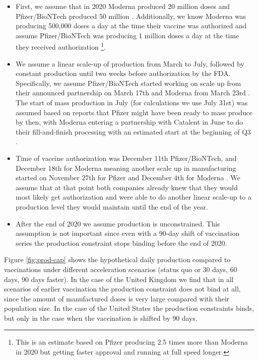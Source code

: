 \documentclass{article}
\providecommand{\tightlist}{%
  \setlength{\itemsep}{0pt}\setlength{\parskip}{0pt}}
\begin{document}
\begin{itemize}
\tightlist
\item
  First, we assume that in 2020 Moderna produced 20 million doses and Pfizer/BioNTech produced 50 million \citep[@Pfizer2020Pfizer]{NPR2020How}. Additionally, we know Moderna was producing 500,000 doses a day at the time their vaccine was authorized and assume Pfizer/BioNTech was producing 1 million doses a day at the time they received authorization \citep{NPR2020How}\footnote{This is an estimate based on Pfizer producing 2.5 times more than Moderna in 2020 but getting faster approval and running at full speed longer.}.
\item
  We assume a linear scale-up of production from March to July, followed by constant production until two weeks before authorization by the FDA. Specifically, we assume Pfizer/BioNTech started working on scale up from their announced partnership on March 17th and Moderna from March 23rd \citep[@Time2020As, @Moderna2020Edited]{Pfizer2020BioNTech}. The start of mass production in July (for calculations we use July 31st) was assumed based on reports that Pfizer might have been ready to mass produce by then, with Moderna entering a partnership with Catalent in June to do their fill-and-finish processing with an estimated start at the beginning of Q3 \citep[@Moderna2020Moderna]{PfizerNDShot}.
\item
  Time of vaccine authorization was December 11th Pfizer/BioNTech, and December 18th for Moderna meaning another scale up in manufacturing started on November 27th for Pfizer and December 4th for Moderna \citep[@FDA2020Second]{FDA2020FDA}. We assume that at that point both companies already knew that they would most likely get authorization and were able to do another linear scale-up to a production level they would maintain until the end of the year.
\item
  After the end of 2020 we assume production is unconstrained. This assumption is not important since even with a 90-day shift of vaccination series the production constraint stops binding before the end of 2020.
\end{itemize}

Figure \ref{fig:prod-cap} shows the hypothetical daily production compared to vaccinations under different acceleration scenarios (status quo or 30 days, 60 days, 90 days faster). In the case of the United Kingdom we find that in all scenarios of earlier vaccination the production constraint does not bind at all, since the amount of manufactured doses is very large compared with their population size. In the case of the United States the production constraints binds, but only in the case when the vaccination is shifted by 90 days.
\end{document}

